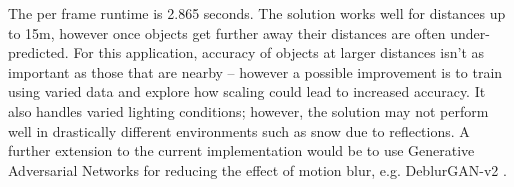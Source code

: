 \documentclass{article}
\begin{document}
	The per frame runtime is 2.865 seconds. The solution works well for distances up to 15m, however once objects get further away their distances are often under-predicted. For this application, accuracy of objects at larger distances isn’t as important as those that are nearby – however a possible improvement is to train using varied data and explore how scaling could lead to increased accuracy. It also handles varied lighting conditions; however, the solution may not perform well in drastically different environments such as snow due to reflections. A further extension to the current implementation would be to use Generative Adversarial Networks for reducing the effect of motion blur, e.g. DeblurGAN-v2 \cite{kupyn2019deblurganv2}.
	
	
	
\end{document}
